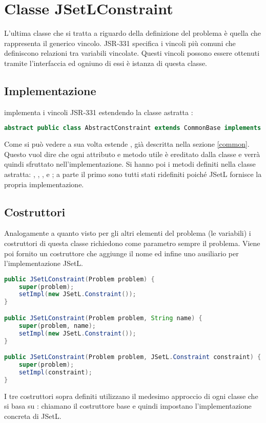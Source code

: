 \section{Classe JSetLConstraint}\label{constraint}
L'ultima classe che si tratta a riguardo della definizione del problema è
quella che rappresenta il generico vincolo. JSR-331 specifica i vincoli più
comuni che definiscono relazioni tra variabili vincolate. Questi vincoli
possono essere ottenuti tramite l'interfaccia  ed ogniuno di
essi è istanza di questa classe.

\subsection{Implementazione}
 implementa i vincoli JSR-331 estendendo la classe
astratta :
\begin{lstlisting}[language = Java,frame = single]
abstract public class AbstractConstraint extends CommonBase implements javax.constraints.Constraint {
\end{lstlisting}
Come si può vedere  a sua volta estende 
, già descritta nella sezione \ref{common}. Questo vuol dire 
che ogni attributo e metodo utile è ereditato dalla classe e verrà quindi 
sfruttato nell'implementazione. Si hanno poi i metodi definiti nella classe 
astratta: ,  ,  ,   e
 ; a parte il primo sono tutti stati ridefiniti poiché JSetL
fornisce la propria implementazione.

\subsection{Costruttori}
Analogamente a quanto visto per gli altri elementi del problema (le variabili)
i costruttori di questa classe richiedono come parametro sempre il problema.
Viene poi fornito un costruttore che aggiunge il nome ed infine uno ausiliario
per l'implementazione JSetL.

\begin{lstlisting}[language = Java,
                   caption = {i costruttori.}]
public JSetLConstraint(Problem problem) {
	super(problem);
	setImpl(new JSetL.Constraint());
}

public JSetLConstraint(Problem problem, String name) {
	super(problem, name);
	setImpl(new JSetL.Constraint());
}

public JSetLConstraint(Problem problem, JSetL.Constraint constraint) {
	super(problem);
	setImpl(constraint);
}
\end{lstlisting}
I tre costruttori sopra definiti utilizzano il medesimo approccio di ogni
classe che si basa su : chiamano il costruttore base e
quindi impostano l'implementazione concreta di JSetL.

